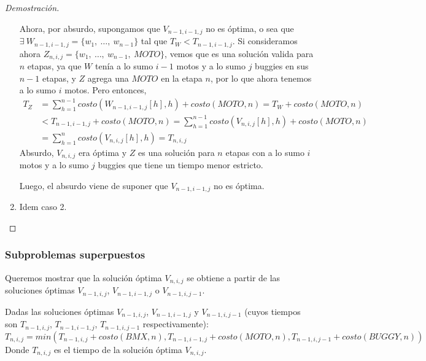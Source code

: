 \begin{proof}[Demostración]
\begin{enumerate}
            Ahora, por absurdo, supongamos que $V_{n-1,i-1,j}$ no es óptima, o sea que $\exists\ W_{n-1,i-1,j} = \{w_1,\ \dots,\ w_{n-1}\}$ tal que $T_{W} < T_{n-1,i-1,j}$.
            Si consideramos ahora $Z_{n,i,j} = \{w_1,\ \dots,\ w_{n-1},\ MOTO\}$, vemos que es una solución valida para $n$ etapas, ya que $W$ tenía a lo sumo $i-1$ motos y a lo sumo $j$ buggies en sus $n-1$ etapas, y $Z$ agrega una $MOTO$ en la etapa $n$, por lo que ahora tenemos a lo sumo $i$ motos.
            Pero entonces,
            \begin{equation*}
                \begin{aligned}
                    T_{Z} &= \sum_{h=1}^{n-1}{costo(W_{n-1,i-1,j}[h], h)} + costo(MOTO,n) = T_{W} + costo(MOTO,n) \\
                          &< T_{n-1,i-1,j} + costo(MOTO,n) = \sum_{h=1}^{n-1}{costo(V_{n,i,j}[h], h)} + costo(MOTO,n) \\
                          &= \sum_{h=1}^{n}{costo(V_{n,i,j}[h], h)} = T_{n,i,j}
                \end{aligned}
            \end{equation*}
            Absurdo, $V_{n,i,j}$ era óptima y $Z$ es una solución para $n$ etapas con a lo sumo $i$ motos y a lo sumo $j$ buggies que tiene un tiempo menor estricto.

            Luego, el absurdo viene de suponer que $V_{n-1,i-1,j}$ no es óptima.
            \item Idem caso 2.
        \end{enumerate}
    \end{proof}

    \subsubsection{Subproblemas superpuestos}

    Queremos mostrar que la solución óptima $V_{n,i,j}$ se obtiene a partir de las soluciones óptimas $V_{n-1,i,j}$, $V_{n-1,i-1,j}$ o $V_{n-1,i,j-1}$.

    \begin{lemma}
        Dadas las soluciones óptimas $V_{n-1,i,j}$, $V_{n-1,i-1,j}$ y $V_{n-1,i,j-1}$ (cuyos tiempos son $T_{n-1,i,j}$, $T_{n-1,i-1,j}$, $T_{n-1,i,j-1}$ respectivamente):
            $$T_{n,i,j} = min(T_{n-1,i,j} + costo(BMX, n), T_{n-1,i-1,j} + costo(MOTO, n), T_{n-1,i,j-1} + costo(BUGGY, n))$$
         Donde $T_{n,i,j}$ es el tiempo de la solución óptima $V_{n,i,j}$.
    \end{lemma}

